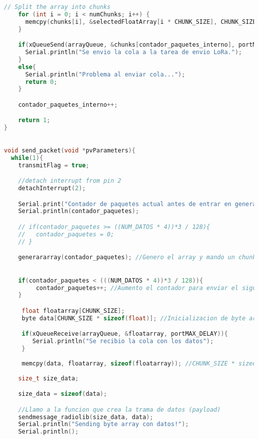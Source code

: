 \begin{lstlisting}[language=C++, caption=Función del sensor inteligente para generar arreglos de datos de aceleración en paquetes de 128 bytes]
    // Split the array into chunks
    for (int i = 0; i < numChunks; i++) {
      memcpy(chunks[i], &selectedFloatArray[i * CHUNK_SIZE], CHUNK_SIZE * sizeof(float)); //Copiar 128bytes de Float Array (a partir de la posicion especificada por i) en chunks
    }

    if(xQueueSend(arrayQueue, &chunks[contador_paquetes_interno], portMAX_DELAY) == pdTRUE){
      Serial.println("Se envio la cola a la tarea de envio LoRa.");
    }
    else{
      Serial.println("Problema al enviar cola...");
      return 0;
    }

    contador_paquetes_interno++;

    return 1;
}

\end{lstlisting}

\begin{lstlisting}[language=C++, caption=Tarea de envío de datos de aceleración desde sensor inteligente]

void send_packet(void *pvParameters){
  while(1){
    transmitFlag = true;

    //detach interrupt from pin 2
    detachInterrupt(2);

    Serial.print("Contador de paquetes actual antes de entrar en generararray: ");
    Serial.println(contador_paquetes);

    // if(contador_paquetes >= ((NUM_DATOS * 4))*3 / 128){
    //   contador_paquetes = 0;
    // }

    generararray(contador_paquetes); //Genero el array y mando un chunk, dependiendo del contador

    
    if(contador_paquetes < (((NUM_DATOS * 4))*3 / 128)){
         contador_paquetes++; //Aumento el contador para enviar el siguiente paquete en el proximo envio
    }

     float floatarray[CHUNK_SIZE];
     byte data[CHUNK_SIZE * sizeof(float)]; //Inicializacion de byte array

     if(xQueueReceive(arrayQueue, &floatarray, portMAX_DELAY)){
        Serial.println("Se recibio la cola con los datos");
     }
    
     memcpy(data, floatarray, sizeof(floatarray)); //CHUNK_SIZE * sizeof(float)
    
    size_t size_data;

    size_data = sizeof(data);

    //Llamo a la funcion que crea la trama de datos (payload)
    sendmessage_radiolib(size_data, data);
    Serial.println("Sending byte array con datos!");
    Serial.println();


\end{lstlisting}

